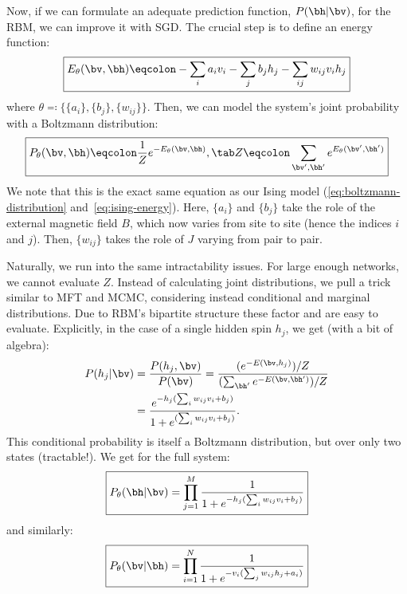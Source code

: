 Now, if we can formulate an adequate prediction function,
$P(\bh\rvert\bv)$, for the RBM, we can improve it with SGD. The
crucial step is to define an energy function:\label{sec:rbm-energy}%
\begin{equation}%
  \boxed{E_\theta(\bv, \bh)\eqcolon-\sum_i a_iv_i -\sum_j b_jh_j-\sum_{ij} w_{ij}v_ih_j \label{eq:rbm-energy-fn}}
\end{equation}
where $\theta\eqcolon\{\{a_i\},\{b_j\},\{w_{ij}\}\}$. Then, we can
model the system's joint probability with a Boltzmann distribution:%
\begin{equation}%
  \boxed{P_\theta(\bv,\bh)\eqcolon\frac{1}{Z}e^{-E_\theta(\bv,\bh)},\tab
    Z\eqcolon\sum_{\bv',\bh'}e^{E_\theta(\bv', \bh')}\label{eq:rbm-joint-dist}}
\end{equation}%
We note that this is the exact same equation as our Ising model
(\ref{eq:boltzmann-distribution} and~\ref{eq:ising-energy}). Here,
$\{a_i\}$ and $\{b_j\}$ take the role of the external magnetic field
$B$, which now varies from site to site (hence the indices $i$ and
$j$). Then, $\{w_{ij}\}$ takes the role of $J$ varying from pair to
pair.

Naturally, we run into the same intractability issues. For large
enough networks, we cannot evaluate $Z$. Instead of calculating joint
distributions, we pull a trick similar to MFT and MCMC, considering
instead conditional and marginal distributions. Due to RBM's bipartite
structure these factor and are easy to evaluate. Explicitly, in the
case of a single hidden spin $h_j$, we get (with a bit of algebra):
\begin{align}%
  P(h_j\rvert\bv)&=\frac{P(h_j,\bv)}{P(\bv)}=\frac{(e^{-E(\bv,h_j)})/Z}{(\sum_{\bh'}e^{-E(\bv,\bh')})/Z}\\
                 &=\frac{e^{-h_j(\sum_i w_{ij}v_i+b_j)}}{1+e^{(\sum_i w_{ij}v_i+b_j)}}.
\end{align}%
This conditional probability is itself a Boltzmann distribution, but
over only two states (tractable!).  We get for the full system:
\begin{equation}
  \boxed{P_\theta(\bh|\bv)=\prod_{j=1}^M \frac{1}{1+e^{-h_j(\sum_i w_{ij} v_i +b_j )}}
  }\label{eq:v-to-h}
\end{equation}%
and similarly:
\begin{equation}
  \boxed{P_\theta(\bv|\bh)=\prod_{i=1}^N \frac{1}{1+e^{-v_i(\sum_j w_{ij} h_j + a_i )}}
  }\label{eq:h-to-v}
\end{equation}

